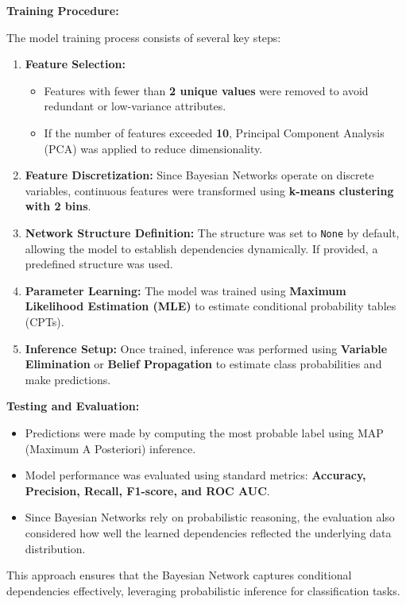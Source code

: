 \textbf{Training Procedure:}  

The model training process consists of several key steps:  

\begin{enumerate}
    \item \textbf{Feature Selection:}  
    \begin{itemize}
        \item Features with fewer than \textbf{2 unique values} were removed to avoid redundant or low-variance attributes.
        \item If the number of features exceeded \textbf{10}, Principal Component Analysis (PCA) was applied to reduce dimensionality.
    \end{itemize}
    \item \textbf{Feature Discretization:}  
    Since Bayesian Networks operate on discrete variables, continuous features were transformed using \textbf{k-means clustering with 2 bins}.
    \item \textbf{Network Structure Definition:}  
    The structure was set to \texttt{None} by default, allowing the model to establish dependencies dynamically. If provided, a predefined structure was used.
    \item \textbf{Parameter Learning:}  
    The model was trained using \textbf{Maximum Likelihood Estimation (MLE)} to estimate conditional probability tables (CPTs).
    \item \textbf{Inference Setup:}  
    Once trained, inference was performed using \textbf{Variable Elimination} or \textbf{Belief Propagation} to estimate class probabilities and make predictions.
\end{enumerate}

\textbf{Testing and Evaluation:}  

\begin{itemize}
    \item Predictions were made by computing the most probable label using MAP (Maximum A Posteriori) inference.
    \item Model performance was evaluated using standard metrics: \textbf{Accuracy, Precision, Recall, F1-score, and ROC AUC}.
    \item Since Bayesian Networks rely on probabilistic reasoning, the evaluation also considered how well the learned dependencies reflected the underlying data distribution.
\end{itemize}

This approach ensures that the Bayesian Network captures conditional dependencies effectively, leveraging probabilistic inference for classification tasks.

